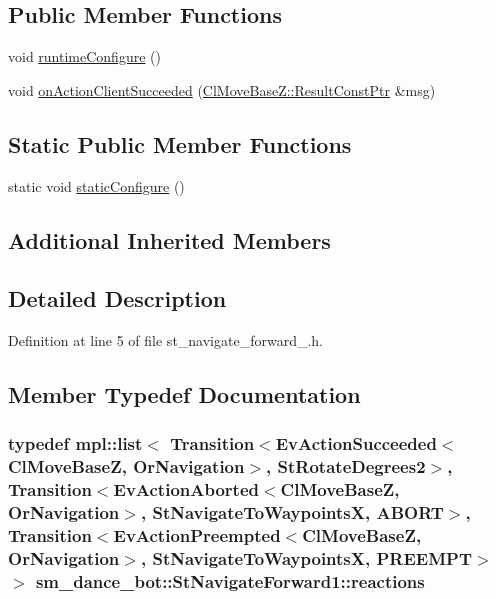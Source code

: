 \subsection*{Public Member Functions}
\begin{DoxyCompactItemize}
\item 
void \hyperlink{structsm__dance__bot_1_1StNavigateForward1_a970f2128e6f29396da2a1545d4dbdc04}{runtime\+Configure} ()
\item 
void \hyperlink{structsm__dance__bot_1_1StNavigateForward1_ab5af8fd66b5c39ffef4829233d449d55}{on\+Action\+Client\+Succeeded} (\hyperlink{classmove__base__z__client_1_1ClMoveBaseZ_a3b774d99d3dd4526f99b968d65ef5834}{Cl\+Move\+Base\+Z\+::\+Result\+Const\+Ptr} \&msg)
\end{DoxyCompactItemize}
\subsection*{Static Public Member Functions}
\begin{DoxyCompactItemize}
\item 
static void \hyperlink{structsm__dance__bot_1_1StNavigateForward1_a5c18e9458f6b9bd0e06f7f242e5bc2da}{static\+Configure} ()
\end{DoxyCompactItemize}
\subsection*{Additional Inherited Members}


\subsection{Detailed Description}


Definition at line 5 of file st\+\_\+navigate\+\_\+forward\+\_.\+h.



\subsection{Member Typedef Documentation}
\subsubsection[{\texorpdfstring{reactions}{reactions}}]{\setlength{\rightskip}{0pt plus 5cm}typedef mpl\+::list$<$ Transition$<$Ev\+Action\+Succeeded$<${\bf Cl\+Move\+BaseZ}, {\bf Or\+Navigation}$>$, {\bf St\+Rotate\+Degrees2}$>$, Transition$<$Ev\+Action\+Aborted$<${\bf Cl\+Move\+BaseZ}, {\bf Or\+Navigation}$>$, {\bf St\+Navigate\+To\+WaypointsX}, {\bf A\+B\+O\+RT}$>$, Transition$<$Ev\+Action\+Preempted$<${\bf Cl\+Move\+BaseZ}, {\bf Or\+Navigation}$>$, {\bf St\+Navigate\+To\+WaypointsX}, {\bf P\+R\+E\+E\+M\+PT}$>$ $>$ {\bf sm\+\_\+dance\+\_\+bot\+::\+St\+Navigate\+Forward1\+::reactions}}\hypertarget{structsm__dance__bot_1_1StNavigateForward1_a4a49d0c774d44f96b17ceac4c6628104}{}\label{structsm__dance__bot_1_1StNavigateForward1_a4a49d0c774d44f96b17ceac4c6628104}


